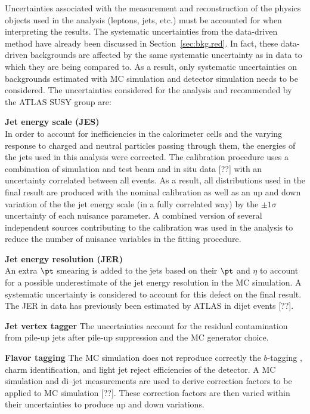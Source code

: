 Uncertainties associated with the measurement and reconstruction of the 
physics objects used in the analysis (leptons, jets, etc.) must be accounted
 for when interpreting the results.
The systematic uncertainties from the data-driven method have already been 
discussed in Section~\ref{sec:bkg.red}. In fact, these data-driven backgrounds 
are affected by the same systematic uncertainty as in data to which they 
are being compared to. As a result, only systematic uncertainties on 
backgrounds estimated with MC simulation and detector simulation needs to 
be considered. The uncertainties considered for the analysis and 
recommended by the ATLAS SUSY group are:

\textbf{Jet energy scale (JES)}  \\  
In order to account for inefficiencies in the calorimeter cells
and the varying response to charged and neutral particles passing through 
them, the energies of the jets used in this analysis were corrected. 
The calibration procedure uses a combination of simulation and test beam 
and in situ data [??] with an uncertainty correlated between all events.
As a result, all distributions used in the final result are produced 
with the nominal calibration as well as an up and down variation of the 
the jet energy scale (in a fully correlated way) by the 
$\pm 1\sigma$ uncertainty of each nuisance parameter.
A combined version of several independent sources contributing to the 
calibration was used in the analysis 
to reduce the number of nuisance variables in the fitting procedure.


\textbf{Jet energy resolution (JER)} \\ %
An extra $\pt$ smearing is added to the jets based on their $\pt$ and $\eta$ 
to account for a possible underestimate of the jet energy resolution 
in the MC simulation. A systematic
uncertainty is considered to account for this defect on the final result. 
The JER in data has previously been estimated by ATLAS in dijet events [??].


\textbf{Jet vertex tagger}
The uncertainties account for the residual contamination from pile-up jets 
after pile-up suppression and the MC generator choice.

\textbf{Flavor tagging}
The MC simulation does not reproduce correctly the $b$-tagging 
, charm identification, and light jet reject efficiencies of the detector. 
A \ttbar MC simulation and di--jet measurements are used to derive 
correction factors to be applied to MC simulation [??].
These correction factors are then varied within
their uncertainties to produce up and down variations.


